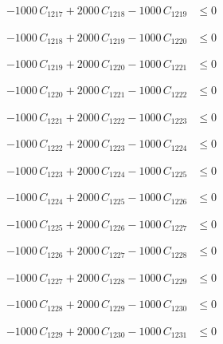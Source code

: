 \documentclass[a4paper,11pt]{article}
\begin{document}
\begin{align}
-1000\,C_{1217} + 2000\,C_{1218} - 1000\,C_{1219} &\leq 0 \nonumber
\end{align}

\begin{align}
-1000\,C_{1218} + 2000\,C_{1219} - 1000\,C_{1220} &\leq 0 \nonumber
\end{align}

\begin{align}
-1000\,C_{1219} + 2000\,C_{1220} - 1000\,C_{1221} &\leq 0 \nonumber
\end{align}

\begin{align}
-1000\,C_{1220} + 2000\,C_{1221} - 1000\,C_{1222} &\leq 0 \nonumber
\end{align}

\begin{align}
-1000\,C_{1221} + 2000\,C_{1222} - 1000\,C_{1223} &\leq 0 \nonumber
\end{align}

\begin{align}
-1000\,C_{1222} + 2000\,C_{1223} - 1000\,C_{1224} &\leq 0 \nonumber
\end{align}

\begin{align}
-1000\,C_{1223} + 2000\,C_{1224} - 1000\,C_{1225} &\leq 0 \nonumber
\end{align}

\begin{align}
-1000\,C_{1224} + 2000\,C_{1225} - 1000\,C_{1226} &\leq 0 \nonumber
\end{align}

\begin{align}
-1000\,C_{1225} + 2000\,C_{1226} - 1000\,C_{1227} &\leq 0 \nonumber
\end{align}

\begin{align}
-1000\,C_{1226} + 2000\,C_{1227} - 1000\,C_{1228} &\leq 0 \nonumber
\end{align}

\begin{align}
-1000\,C_{1227} + 2000\,C_{1228} - 1000\,C_{1229} &\leq 0 \nonumber
\end{align}

\begin{align}
-1000\,C_{1228} + 2000\,C_{1229} - 1000\,C_{1230} &\leq 0 \nonumber
\end{align}

\begin{align}
-1000\,C_{1229} + 2000\,C_{1230} - 1000\,C_{1231} &\leq 0 \nonumber
\end{align}
\end{document}
